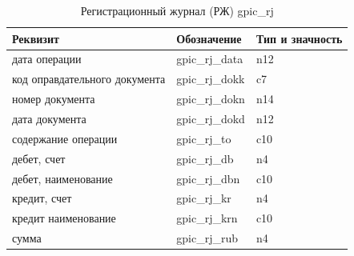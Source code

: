 \begin{table}[h!]
    \centering
    \scriptsize
    \caption{Регистрационный журнал (РЖ) gpic\_rj}
    \begin{tabular}{|l|l|l|} 

\hline
\textbf{Реквизит}               &\textbf{Обозначение}   &\textbf{Тип и значность}   \\ \hline
дата операции                   &gpic\_rj\_data         &n12                        \\ \hline
код оправдательного документа   &gpic\_rj\_dokk         &c7                         \\ \hline
номер документа                 &gpic\_rj\_dokn         &n14                        \\ \hline
дата документа                  &gpic\_rj\_dokd         &n12                        \\ \hline
содержание операции             &gpic\_rj\_to           &c10                        \\ \hline
дебет, счет                     &gpic\_rj\_db           &n4                         \\ \hline
дебет, наименование             &gpic\_rj\_dbn          &c10                        \\ \hline
кредит, счет                    &gpic\_rj\_kr           &n4                         \\ \hline
кредит наименование             &gpic\_rj\_krn          &c10                        \\ \hline
сумма                           &gpic\_rj\_rub          &n4                         \\ \hline

    \end{tabular}
\end{table}

